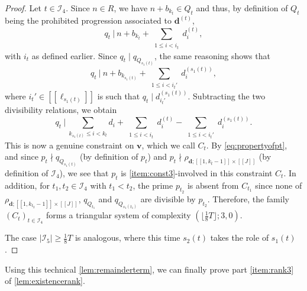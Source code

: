 \documentclass[11pt]{amsart}
\theoremstyle{definition}
\renewcommand{\leq}{\leqslant}
\renewcommand{\geq}{\geqslant}
\newcommand{\interval}[2]{[\![#1,#2]\!] }
\newcommand{\sinterval}[1]{[\![#1]\!] }
\newcommand{\abs}[1]{\left|#1\right|}
\renewcommand{\d}{\boldsymbol{d}}
\newcommand{\sommespart}{b}
\newcommand{\fprod}[1]{\rho_{#1}}
\newcommand{\bmid}{\  \Big\vert}
\renewcommand{\vec}{\boldsymbol}
\newcommand{\modulus}{q}
\newcommand{\indexset}{\mathcal{I}}
\newcommand{\newR}{\sinterval{J}}
\newcommand{\nellp}[1]{\ell_{#1}}
\newcommand{\ncond}{T}
\newcommand{\mprimeone}{p}
\newcommand{\mprimetwo}{q}
\begin{document}
\begin{proof}
Let $t\in \indexset_4$. Since $n\in R$, we have $n+\sommespart_{k_t} \in Q_t$ and thus, by definition of $Q_t$ being the prohibited progression associated to $\d^{(t)}$,
\begin{equation*}
	\mprimetwo_t \bmid\  n + \sommespart_{k_t} + \sum_{\substack{1\leq i<i_t}} d_i^{(t)},
\end{equation*}
with $i_t$ as defined earlier. Since $\mprimetwo_t\mid \modulus_{Q_{s_1(t)}}$, the same reasoning shows that
\begin{equation*}
	\mprimetwo_t \bmid\  n + \sommespart_{k_{s_1(t)}} + \sum_{\substack{1\leq i<i_t'}} d_i^{(s_1(t))},
\end{equation*}
where $i_t'\in \sinterval{\nellp{s_1(t)}}$ is such that $\mprimetwo_t\mid d^{(s_1(t))}_{i_t'}$. Subtracting the two divisibility relations, we obtain
\begin{equation*}
	\mprimetwo_t \bmid\ \sum_{k_{s_1(t)} \leq i< k_t} d_i + \sum_{\substack{1\leq i<i_t}} d_i^{(t)} - \sum_{\substack{1\leq i<i_t'}} d_i^{(s_1(t))}.
\end{equation*}
This is now a genuine constraint on $\vec{v}$, which we call $C_t$. By \cref{eq:propertyofpt}, and since $\mprimeone_t\nmid \modulus_{Q_{s_1(t)}}$ (by definition of $\mprimeone_t$) and $\mprimeone_t \nmid \fprod{\d;\interval{1}{k_t-1}\!\times\! \newR}$ (by definition of $\indexset_4$), we see that $\mprimeone_t$ is \cref{item:const3}-involved in this constraint $C_t$. In addition, for $t_1,t_2\in \indexset_4$ with $t_1<t_2$, the prime $\mprimeone_{t_2}$ is absent from $C_{t_1}$ since none of $\fprod{\d;\interval{1}{k_{t_2}-1}\!\times\! \newR}$, $ \modulus_{Q_{t_1}}$ and $\modulus_{Q_{s_1(t_1)}}$ are divisible by $\mprimeone_{t_2}$. Therefore, the family $(C_t)_{t\in \indexset_4}$ forms a triangular system of complexity $(\lfloor \tfrac{1}{8} \ncond\rfloor; 3, 0)$.

The case $\abs{\indexset_5} \geq  \tfrac{1}{8} \ncond$ is analogous, where this time $s_2(t)$ takes the role of $s_1(t)$.
\end{proof}

Using this technical \cref{lem:remainderterm}, we can finally prove part \cref{item:rank3} of \cref{lem:existencerank}.
\end{document}
